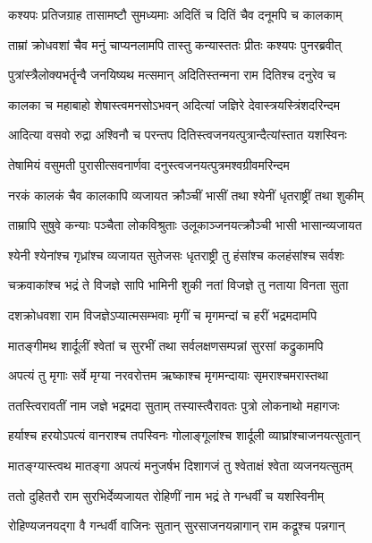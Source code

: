 \twolineshloka
{कश्यपः प्रतिजग्राह तासामष्टौ सुमध्यमाः}
{अदितिं च दितिं चैव दनूमपि च कालकाम्} %

\twolineshloka
{ताम्रां क्रोधवशां चैव मनुं चाप्यनलामपि}
{तास्तु कन्यास्ततः प्रीतः कश्यपः पुनरब्रवीत्} %

\twolineshloka
{पुत्रांस्त्रैलोक्यभर्तॄन्वै जनयिष्यथ मत्समान्}
{अदितिस्तन्मना राम दितिश्च दनुरेव च} %

\twolineshloka
{कालका च महाबाहो शेषास्त्वमनसोऽभवन्}
{अदित्यां जज्ञिरे देवास्त्रयस्त्रिंशदरिन्दम} %

\twolineshloka
{आदित्या वसवो रुद्रा अश्विनौ च परन्तप}
{दितिस्त्वजनयत्पुत्रान्दैत्यांस्तात यशस्विनः} %

\twolineshloka
{तेषामियं वसुमती पुरासीत्सवनार्णवा}
{दनुस्त्वजनयत्पुत्रमश्वग्रीवमरिन्दम} %

\twolineshloka
{नरकं कालकं चैव कालकापि व्यजायत}
{क्रौञ्चीं भासीं तथा श्येनीं धृतराष्ट्रीं तथा शुकीम्} %

\twolineshloka
{ताम्रापि सुषुवे कन्याः पञ्चैता लोकविश्रुताः}
{उलूकाञ्जनयत्क्रौञ्ची भासी भासान्व्यजायत} %

\twolineshloka
{श्येनी श्येनांश्च गृध्रांश्च व्यजायत सुतेजसः}
{धृतराष्ट्री तु हंसांश्च कलहंसांश्च सर्वशः} %

\twolineshloka
{चक्रवाकांश्च भद्रं ते विजज्ञे सापि भामिनी}
{शुकी नतां विजज्ञे तु नताया विनता सुता} %

\twolineshloka
{दशक्रोधवशा राम विजज्ञेऽप्यात्मसम्भवाः}
{मृगीं च मृगमन्दां च हरीं भद्रमदामपि} %

\twolineshloka
{मातङ्गीमथ शार्दूलीं श्वेतां च सुरभीं तथा}
{सर्वलक्षणसम्पन्नां सुरसां कद्रुकामपि} %

\twolineshloka
{अपत्यं तु मृगाः सर्वे मृग्या नरवरोत्तम}
{ऋष्काश्च मृगमन्दायाः सृमराश्चमरास्तथा} %

\twolineshloka
{ततस्त्विरावतीं नाम जज्ञे भद्रमदा सुताम्}
{तस्यास्त्वैरावतः पुत्रो लोकनाथो महागजः} %

\twolineshloka
{हर्याश्च हरयोऽपत्यं वानराश्च तपस्विनः}
{गोलाङ्गूलांश्च शार्दूली व्याघ्रांश्चाजनयत्सुतान्} %

\twolineshloka
{मातङ्ग्यास्त्वथ मातङ्गा अपत्यं मनुजर्षभ}
{दिशागजं तु श्वेताक्षं श्वेता व्यजनयत्सुतम्} %

\twolineshloka
{ततो दुहितरौ राम सुरभिर्देव्यजायत}
{रोहिणीं नाम भद्रं ते गन्धर्वीं च यशस्विनीम्} %

\twolineshloka
{रोहिण्यजनयद्गा वै गन्धर्वी वाजिनः सुतान्}
{सुरसाजनयन्नागान् राम कद्रूश्च पन्नगान्} %


